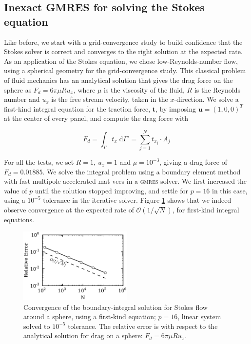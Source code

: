 \documentclass[final,leqno,]{siamltex1213}
\renewcommand{\O}[1]{\mathcal{O}(#1)}
\newcommand{\gmres}{\textsc{gmres}\xspace}
\newcommand{\di}[1]{\text{d}#1}
\newcommand{\vect}[1]{\mathbf{#1}}
\begin{document}
\subsection{Inexact {\small GMRES} for solving the Stokes equation}
Like before, we start with a grid-convergence study to build confidence that the Stokes solver is correct and converges to the right solution at the expected rate. As an application of the Stokes equation, we chose low-Reynolds-number flow, using a spherical geometry for the grid-convergence study. This classical problem of fluid mechanics has an analytical solution that gives the drag force on the sphere as $F_d = 6\pi\mu Ru_x$, where $\mu$ is the viscosity of the fluid, $R$ is the Reynolds number and $u_x$ is the free stream velocity, taken in the $x$-direction. We solve a first-kind integral equation for the traction force, $\vect{t}$, by imposing $\vect{u} = (1,0,0)^{T}$ at the center of every panel, and compute the drag force with

\begin{equation}
	\label{eqn:stokes_traction_drag}
	F_d = \int_\Gamma t_x\;\di{\Gamma'} = \sum_{j=1}^{N} t_{x_j}\cdot A_j
\end{equation}

For all the tests, we set $R=1$, $u_x = 1$ and $\mu = 10^{-3}$, giving a drag force of $F_d = 0.01885$. We solve the integral problem using a boundary element method with fast-multipole-accelerated mat-vecs in a \gmres solver. We first increased the value of $p$ until the solution stopped improving, and settle for $p=16$ in this case, using a $10^{-5}$ tolerance in the iterative solver.
Figure \ref{fig:stokes_convergence} shows that we indeed observe convergence at the expected rate of $\O{1 / \sqrt{N}}$, for first-kind integral equations.

\begin{figure}[ht]
\begin{center}
	\includegraphics[natwidth=3in,natheight=2in,width=0.5\textwidth]{StokesConvergence.pdf}
	\caption{Convergence of the boundary-integral solution for Stokes flow around a sphere, using a  first-kind equation; $p=16$, linear system solved to $10^{-5}$ tolerance. The relative error is with respect to the analytical solution for drag on a sphere: $F_d = 6\pi\mu Ru_x$.}
	\label{fig:stokes_convergence}
\end{center}
\end{figure}
\end{document}
